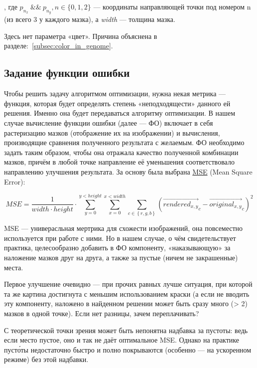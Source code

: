 , где $p_{n_x} ~\&\&~ p_{n_y}, n \in \{ 0, 1, 2 \}$ — координаты направляющей точки под номером n (из всего 3 у каждого мазка),
а \textit{width}  — толщина мазка.

Здесь нет параметра  «цвет».
Причина объяснена в разделе:~\ref{subsec:color_in_genome}.

\subsection{Задание функции ошибки}
Чтобы решить задачу алгоритмом оптимизации, нужна некая метрика — функция, которая будет определять степень «неподходящести» данного ей решения.
Именно она будет передаваться алгоритму оптимизации.
В нашем случае вычисление функции ошибки (далее — ФО) включает в себя растеризацию мазков (отображение их на изображении) и вычисления, производящие сравнения полученного результата с желаемым.
ФО необходимо задать таким образом, чтобы она отражала качество полученной комбинации мазков,
причём в любой точке направление её уменьшения соответствовало направлению улучшения результата.
За основу была выбрана \href{https://en.wikipedia.org/wiki/Mean_squared_error}{MSE} (Mean Square Error):

\begin{equation}\label{eq:equation}
    MSE = \frac{1}{width \cdot height} \cdot \sum_{y = 0}^{y < height} { \sum_{x = 0}^{x < width} { \sum_{c \in  \left\{ r, g, b \right\} } { \left( {\overrightarrow {rendered_{x, y}}}_c - {\overrightarrow{original_{x, y}}}_c\right)^2 }}}
\end{equation}

MSE — универасльная мертрика для схожести изображений, она повсеместно используется при работе с ними.
Но в нашем случае, о чём свидетельствует практика, целесообразно добавить в ФО компоненту, «наказывающую» за наложение мазков друг на друга, а также за пустые (ничем не закрашенные) места.

Первое улучшение очевидно — при прочих равных лучше ситуация, при которой та же картина достигнута с меньшим использованием краски
(а если не вводить эту компоненту, наложено в найденном решении может быть сразу много (> 2) мазков в одной точке).
Если нет разницы, зачем переплачивать?

С теоретической точки зрения может быть непонятна надбавка за пустоты: ведь если место пустое, оно и так не даёт оптимальное MSE.
Однако на практике пусто́ты недостаточно быстро и полно покрываются (особенно — на ускоренном режиме) без этой надбавки.

